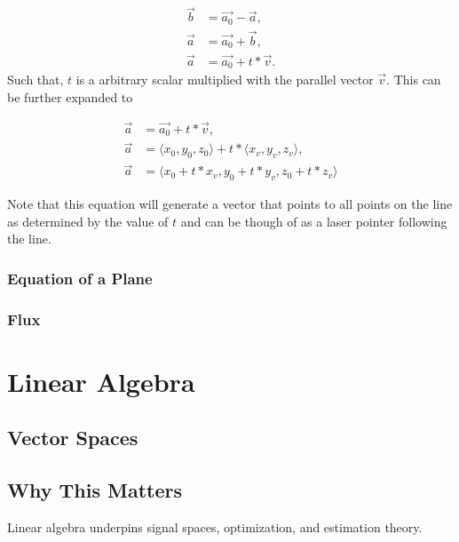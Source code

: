 \begin{align}
    \vec{b} &= \vec{a_0} - \vec{a}, \\
    \vec{a} &= \vec{a_0} +  \vec{b}, \\
    \vec{a} &= \vec{a_0} + t * \vec{v}.
\end{align} 
Such that, $t$ is a arbitrary scalar multiplied with the parallel vector $\vec{v}$. This can be further expanded to 

\begin{align}
    \vec{a} &= \vec{a_0} + t * \vec{v}, \\
    \vec{a} &= \langle x_0, y_0, z_0\rangle + t * \langle x_v, y_v, z_v\rangle, \\ 
    \vec{a} &= \langle x_0 + t*x_v, y_0+ t*y_v, z_0+ t*z_v\rangle
\end{align}

Note that this equation will generate a vector that points to all points on the line as determined by the value of $t$ and can be though of as a laser pointer following the line. 

\subsubsection{Equation of a Plane}


\subsubsection{Flux}
\label{sec:Flux}


\section{Linear Algebra}

\subsection{Vector Spaces}
\label{sec:vector Space}


\subsection{Why This Matters}
Linear algebra underpins signal spaces, optimization, and estimation theory.
